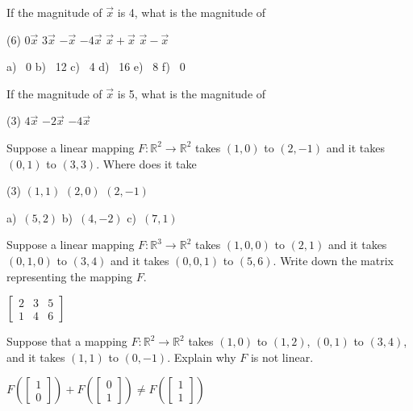 \begin{exercise}
If the magnitude of $\vec{x}$ is 4, what is the magnitude of
\begin{tasks}(6)
\task
$0\vec{x}$
\task
$3\vec{x}$
\task
$-\vec{x}$
\task
$-4\vec{x}$
\task
$\vec{x}+\vec{x}$
\task
$\vec{x}-\vec{x}$
\end{tasks}
\end{exercise}
\comboSol{%
}
{%
a)~ 0 \quad b)~ 12 \quad c)~ 4 \quad d)~ 16 \quad e)~ 8 \quad f)~ 0
}

\begin{exercise}\ansMark%
If the magnitude of $\vec{x}$ is 5, what is the magnitude of
\begin{tasks}(3)
\task
$4\vec{x}$
\task
$-2\vec{x}$
\task
$-4\vec{x}$
\end{tasks}
\end{exercise}

\begin{exercise}
Suppose a linear mapping $F \colon {\mathbb R}^2 \to {\mathbb R}^2$
takes $(1,0)$ to $(2,-1)$ and it takes $(0,1)$ to $(3,3)$. 
Where does it take
\begin{tasks}(3)
\task
$(1,1)$
\task
$(2,0)$
\task
$(2,-1)$
\end{tasks}
\end{exercise}
\comboSol{%
}
{%
a)~$(5,2)$ \quad b)~$(4, -2)$ \quad c)~$(7,1)$
}

\begin{exercise}
Suppose a linear mapping $F \colon {\mathbb R}^3 \to {\mathbb R}^2$
takes $(1,0,0)$ to $(2,1)$ and it takes $(0,1,0)$ to $(3,4)$ and
it takes $(0,0,1)$ to $(5,6)$.  Write down the matrix representing
the mapping $F$.
\end{exercise}
\comboSol{%
}
{%
$\left[\begin{smallmatrix} 2 & 3 & 5 \\ 1 & 4 & 6 \end{smallmatrix}\right]$
}

\begin{exercise}
Suppose that a mapping $F \colon {\mathbb R}^2 \to \mathbb{R}^2$ takes
$(1,0)$ to $(1,2)$, $(0,1)$ to $(3,4)$, and it takes $(1,1)$ to $(0,-1)$.
Explain why $F$ is not linear.
\end{exercise}
\comboSol{%
}
{%
$F\left(\left[\begin{smallmatrix} 1 \\ 0 \end{smallmatrix}\right]\right) + F\left(\left[\begin{smallmatrix} 0 \\ 1 \end{smallmatrix}\right]\right) \neq F\left(\left[\begin{smallmatrix} 1 \\ 1 \end{smallmatrix}\right]\right)$
}

